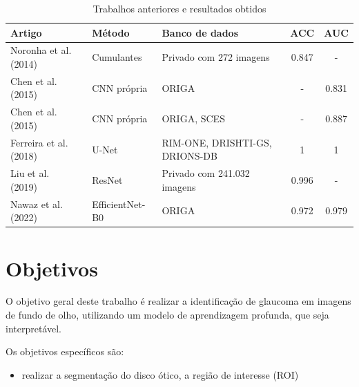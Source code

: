 \documentclass[12pt]{article}
\begin{document}
\begin{table}[htb]
    \centering
    \begin{tabular}{|l|l|p{3cm}|c|c|}
    \hline
    Artigo                                      & Método      & Banco de dados                 & ACC   & AUC   \\
    \hline
    Noronha et al. (2014)~\cite{noronha2014hoc} & Cumulantes  & Privado com 272 imagens        & 0.847 &  -    \\
    \hline
    Chen et al. (2015)~\cite{chen2015cnn}       & CNN própria & ORIGA                          & -     & 0.831 \\
    \hline
    Chen et al. (2015)~\cite{chen2015cnn}       & CNN própria & ORIGA, SCES                    & -     & 0.887 \\
    \hline
    Ferreira et al. (2018)~\cite{ferreira_cnn_2018} & U-Net   & RIM-ONE, DRISHTI-GS, DRIONS-DB & 1     & 1     \\
    \hline
    Liu et al. (2019)~\cite{liu_cnn_2019}       & ResNet      & Privado com 241.032 imagens    & 0.996 & -     \\
    \hline
    Nawaz et al. (2022)~\cite{nawaz_efficient_2022} & EfficientNet-B0 & ORIGA                  & 0.972 & 0.979 \\
    \hline
    \end{tabular}
    \caption{Trabalhos anteriores e resultados obtidos}
    \label{tab:trabalhos}
\end{table}

\bigskip

\section{Objetivos}
\label{sec:objetivo}

O objetivo geral deste trabalho é realizar a identificação de glaucoma em imagens de fundo de olho, utilizando um modelo de aprendizagem profunda, que seja interpretável.

Os objetivos específicos são:
\begin{itemize}
 \item realizar a segmentação do disco ótico, a região de interesse (ROI)
\end{itemize}
\end{document}
